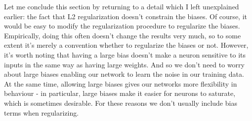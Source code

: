 \documentclass[a4paper,twoside,10pt]{book}
\begin{document}
Let me conclude this section by returning to a detail which I left unexplained earlier: the fact that L2 regularization doesn't constrain the biases. Of course, it would be easy to modify the regularization procedure to regularize the biases. Empirically, doing this often doesn't change the results very much, so to some extent it's merely a convention whether to regularize the biases or not. However, it's worth noting that having a large bias doesn't make a neuron sensitive to its inputs in the same way as having large weights. And so we don't need to worry about large biases enabling our network to learn the noise in our training data. At the same time, allowing large biases gives our networks more flexibility in behaviour - in particular, large biases make it easier for neurons to saturate, which is sometimes desirable. For these reasons we don't usually include bias terms when regularizing.
\end{document}
